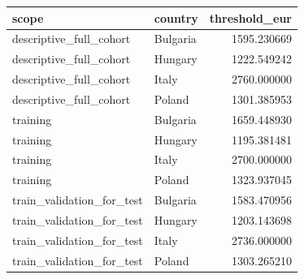 \begin{tabular}{llr}
\toprule
scope & country & threshold_eur \\
\midrule
descriptive_full_cohort & Bulgaria & 1595.230669 \\
descriptive_full_cohort & Hungary & 1222.549242 \\
descriptive_full_cohort & Italy & 2760.000000 \\
descriptive_full_cohort & Poland & 1301.385953 \\
training & Bulgaria & 1659.448930 \\
training & Hungary & 1195.381481 \\
training & Italy & 2700.000000 \\
training & Poland & 1323.937045 \\
train_validation_for_test & Bulgaria & 1583.470956 \\
train_validation_for_test & Hungary & 1203.143698 \\
train_validation_for_test & Italy & 2736.000000 \\
train_validation_for_test & Poland & 1303.265210 \\
\bottomrule
\end{tabular}
